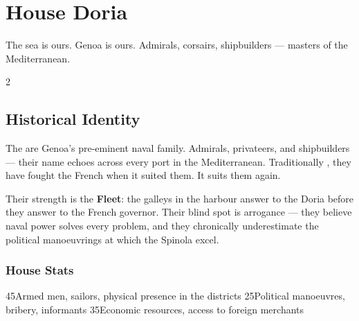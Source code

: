 
\chapter{House Doria}
\label{ch:doria}


%
  {The sea is ours. Genoa is ours.}%
  {Admirals, corsairs, shipbuilders --- masters of the Mediterranean.}

\begin{multicols}{2}

\section{Historical Identity}
\label{sec:doria-identity}

The  are Genoa's pre-eminent naval family. Admirals, privateers,
and shipbuilders --- their name echoes across every port in the Mediterranean.
Traditionally , they have fought the French when it suited them.
It suits them again.

Their strength is the \textbf{Fleet}: the galleys in the harbour answer to
the Doria before they answer to the French governor. Their blind spot is
arrogance --- they believe naval power solves every problem, and they
chronically underestimate the political manoeuvrings at which the Spinola excel.

\columnbreak

\subsection{House Stats}


    {4}{5}{Armed men, sailors, physical presence in the districts}
 {2}{5}{Political manoeuvres, bribery, informants}
 {3}{5}{Economic resources, access to foreign merchants}

\end{multicols}

